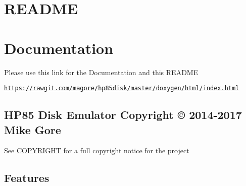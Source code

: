 \hypertarget{md_README_README}{}\section{R\+E\+A\+D\+ME}\label{md_README_README}
\section*{Documentation}


\begin{DoxyItemize}
\item Please use this link for the Documentation and this R\+E\+A\+D\+ME
\begin{DoxyItemize}
\item \href{https://rawgit.com/magore/hp85disk/master/doxygen/html/index.html}{\tt https\+://rawgit.\+com/magore/hp85disk/master/doxygen/html/index.\+html}
\end{DoxyItemize}
\end{DoxyItemize}

\subsection*{H\+P85 Disk Emulator Copyright \copyright{} 2014-\/2017 Mike Gore}


\begin{DoxyItemize}
\item See \hyperlink{md_COPYRIGHT}{C\+O\+P\+Y\+R\+I\+G\+HT} for a full copyright notice for the project
\end{DoxyItemize}

\subsection*{Features}


